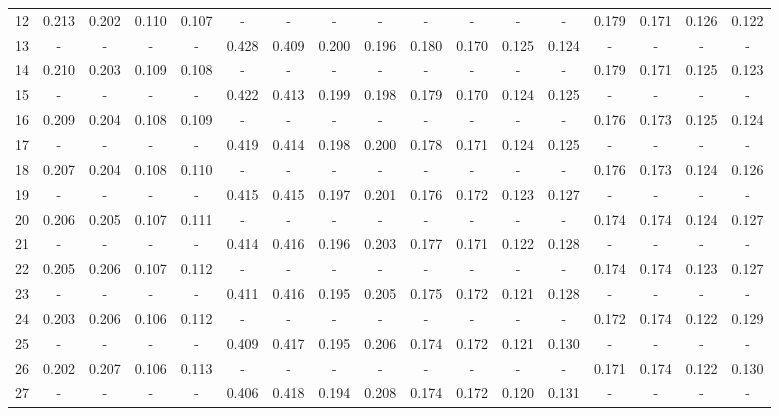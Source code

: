 \documentclass{report}
\begin{document}
\begin{appendices}
\begin{table}
\begin{tabular}{|c|cccc|cccc|cccc|cccc|}
12 & 0.213 & 0.202 & 0.110 & 0.107 &   -   &   -   &   -   &   -   &   -   &   -   &   -   &   -   & 0.179 & 0.171 & 0.126 & 0.122\\
13 &   -   &   -   &   -   &   -   & 0.428 & 0.409 & 0.200 & 0.196 & 0.180 & 0.170 & 0.125 & 0.124 &   -   &   -   &   -   &   -  \\
14 & 0.210 & 0.203 & 0.109 & 0.108 &   -   &   -   &   -   &   -   &   -   &   -   &   -   &   -   & 0.179 & 0.171 & 0.125 & 0.123\\
15 &   -   &   -   &   -   &   -   & 0.422 & 0.413 & 0.199 & 0.198 & 0.179 & 0.170 & 0.124 & 0.125 &   -   &   -   &   -   &   -  \\
16 & 0.209 & 0.204 & 0.108 & 0.109 &   -   &   -   &   -   &   -   &   -   &   -   &   -   &   -   & 0.176 & 0.173 & 0.125 & 0.124\\
17 &   -   &   -   &   -   &   -   & 0.419 & 0.414 & 0.198 & 0.200 & 0.178 & 0.171 & 0.124 & 0.125 &   -   &   -   &   -   &   -  \\
18 & 0.207 & 0.204 & 0.108 & 0.110 &   -   &   -   &   -   &   -   &   -   &   -   &   -   &   -   & 0.176 & 0.173 & 0.124 & 0.126\\
19 &   -   &   -   &   -   &   -   & 0.415 & 0.415 & 0.197 & 0.201 & 0.176 & 0.172 & 0.123 & 0.127 &   -   &   -   &   -   &   -  \\
20 & 0.206 & 0.205 & 0.107 & 0.111 &   -   &   -   &   -   &   -   &   -   &   -   &   -   &   -   & 0.174 & 0.174 & 0.124 & 0.127\\
21 &   -   &   -   &   -   &   -   & 0.414 & 0.416 & 0.196 & 0.203 & 0.177 & 0.171 & 0.122 & 0.128 &   -   &   -   &   -   &   -  \\
22 & 0.205 & 0.206 & 0.107 & 0.112 &   -   &   -   &   -   &   -   &   -   &   -   &   -   &   -   & 0.174 & 0.174 & 0.123 & 0.127\\
23 &   -   &   -   &   -   &   -   & 0.411 & 0.416 & 0.195 & 0.205 & 0.175 & 0.172 & 0.121 & 0.128 &   -   &   -   &   -   &   -  \\
24 & 0.203 & 0.206 & 0.106 & 0.112 &   -   &   -   &   -   &   -   &   -   &   -   &   -   &   -   & 0.172 & 0.174 & 0.122 & 0.129\\
25 &   -   &   -   &   -   &   -   & 0.409 & 0.417 & 0.195 & 0.206 & 0.174 & 0.172 & 0.121 & 0.130 &   -   &   -   &   -   &   -  \\
26 & 0.202 & 0.207 & 0.106 & 0.113 &   -   &   -   &   -   &   -   &   -   &   -   &   -   &   -   & 0.171 & 0.174 & 0.122 & 0.130\\
27 &   -   &   -   &   -   &   -   & 0.406 & 0.418 & 0.194 & 0.208 & 0.174 & 0.172 & 0.120 & 0.131 &   -   &   -   &   -   &   -  \\

\end{tabular}
\end{table}
\end{appendices}
\end{document}
